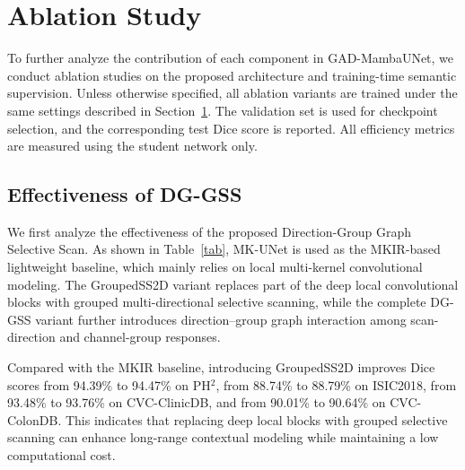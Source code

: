 \section{Ablation Study}
\label{sec}

To further analyze the contribution of each component in GAD-MambaUNet, we conduct ablation studies on the proposed architecture and training-time semantic supervision. Unless otherwise specified, all ablation variants are trained under the same settings described in Section~\ref{sec}. The validation set is used for checkpoint selection, and the corresponding test Dice score is reported. All efficiency metrics are measured using the student network only.

\subsection{Effectiveness of DG-GSS}

\begin{table}[t]
    \centering
    \caption{Ablation study of the proposed DG-GSS module. Dice scores are reported in \%. Params and FLOPs are measured using the student network only.}
    \label{tab:ablation_dggss}
    \scriptsize
\end{table}

We first analyze the effectiveness of the proposed Direction-Group Graph Selective Scan. As shown in Table~\ref{tab}, MK-UNet is used as the MKIR-based lightweight baseline, which mainly relies on local multi-kernel convolutional modeling. The GroupedSS2D variant replaces part of the deep local convolutional blocks with grouped multi-directional selective scanning, while the complete DG-GSS variant further introduces direction--group graph interaction among scan-direction and channel-group responses.

Compared with the MKIR baseline, introducing GroupedSS2D improves Dice scores from 94.39\% to 94.47\% on PH$^2$, from 88.74\% to 88.79\% on ISIC2018, from 93.48\% to 93.76\% on CVC-ClinicDB, and from 90.01\% to 90.64\% on CVC-ColonDB. This indicates that replacing deep local blocks with grouped selective scanning can enhance long-range contextual modeling while maintaining a low computational cost.

